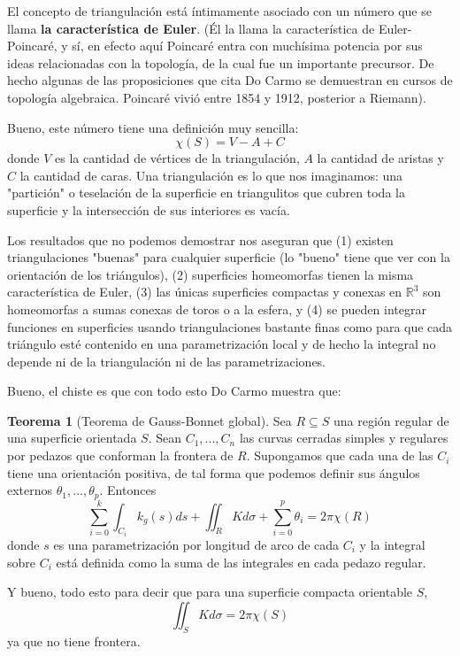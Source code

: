 \documentclass[spanish]{book}
\theoremstyle{definition}
\newtheorem*{teo}{Teorema}
\newcommand{\R}{\mathbb{R}}
\begin{document}
El concepto de triangulación está íntimamente asociado con un número que se llama \textbf{la característica de Euler}. (Él la llama la característica de Euler-Poincaré, y sí, en efecto aquí Poincaré entra con muchísima potencia por sus ideas relacionadas con la topología, de la cual fue un importante precursor. De hecho algunas de las proposiciones que cita Do Carmo se demuestran en cursos de topología algebraica. Poincaré vivió entre 1854 y 1912, posterior a Riemann).

Bueno, este número tiene una definición muy sencilla:
\[\chi(S)=V-A+C\]
donde $V$ es la cantidad de vértices de la triangulación, $A$ la cantidad de aristas y $C$ la cantidad de caras. Una triangulación es lo que nos imaginamos: una "partición" o teselación de la superficie en triangulitos que cubren toda la superficie y la intersección de sus interiores es vacía.

Los resultados que no podemos demostrar nos aseguran que (1) existen triangulaciones "buenas" para cualquier superficie (lo "bueno" tiene que ver con la orientación de los triángulos), (2) superficies homeomorfas tienen la misma característica de Euler, (3) las únicas superficies compactas y conexas en $\R^3$ son homeomorfas a sumas conexas de toros o a la esfera, y (4) se pueden integrar funciones en superficies usando triangulaciones bastante finas como para que cada triángulo esté contenido en una parametrización local y de hecho la integral no depende ni de la triangulación ni de las parametrizaciones.

Bueno, el chiste es que con todo esto Do Carmo muestra que:
\begin{teo}[Teorema de Gauss-Bonnet global]
	Sea $R\subseteq S$ una región regular de una superficie orientada $S$. Sean $C_1,...,C_n$ las curvas cerradas simples y regulares por pedazos que conforman la frontera de $R$. Supongamos que cada una de las $C_i$ tiene una orientación positiva, de tal forma que podemos definir sus ángulos externos $\theta_1,...,\theta_p$. Entonces
	\[\sum_{i=0}^k\int_{C_i} k_g(s)ds+\iint_R Kd\sigma+\sum_{i=0}^p\theta_i=2\pi\chi(R)\]
	donde $s$ es una parametrización por longitud de arco de cada $C_i$ y la integral sobre $C_i$ está definida como la suma de las integrales en cada pedazo regular.
\end{teo}
Y bueno, todo esto para decir que para una superficie compacta orientable $S$,
\[\iint_SKd\sigma=2\pi\chi(S)\]
ya que no tiene frontera.
\end{document}
